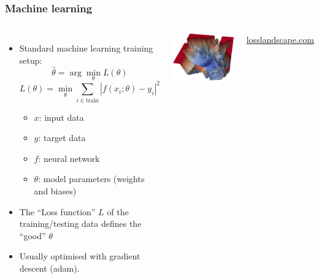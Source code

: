 \documentclass[aspectratio=169]{beamer}
\begin{document}
\begin{frame}
    \frametitle{Machine learning}
    \begin{columns}
        \begin{itemize}
            \item Standard machine learning training setup:
                \[ \hat{\theta} = \arg\min_\theta L(\theta) \]
                \[ L(\theta) = \min_{\theta} \sum_{i\in\text{train}} |f(x_i;\theta)-y_i|^2 \]
                \begin{itemize}
                    \item $x$: input data
                    \item $y$: target data
                    \item $f$: neural network
                    \item $\theta$: model parameters (weights and biases)
                \end{itemize}
            \item The ``Loss function'' $L$ of the training/testing data defines the ``good'' $\theta$
            \item Usually optimised with gradient descent (adam).
        \end{itemize}
        
        \includegraphics[width=\textwidth]{figures/loss_landscape}

        \hfill\href{https://losslandscape.com}{losslandscape.com}
    \end{columns}
\end{frame}
\end{document}
